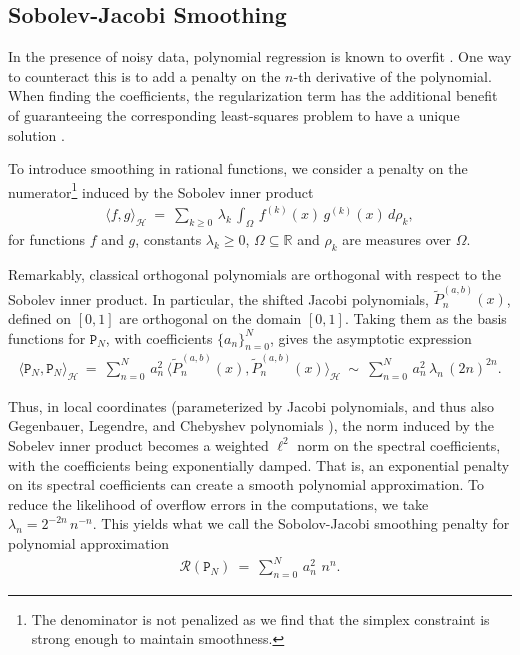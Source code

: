\documentclass{article}
\newcommand{\PP}{{\mathtt P}}
\begin{document}
\subsection{Sobolev-Jacobi Smoothing} {In the presence of noisy data, polynomial regression is known to overfit \cite{intro_to_stat_learning}. One way to counteract this is to add a penalty on the $n$-th derivative of the polynomial. When finding the coefficients, the regularization term has the additional benefit of guaranteeing the corresponding least-squares problem to have a unique solution \cite{Hoerl2000, vanwieringen2023}.} 

To introduce smoothing in rational functions, we consider a penalty on the numerator\footnote{The denominator is not penalized as we find that the simplex constraint is strong enough to maintain smoothness.} induced by the Sobolev inner product
\begin{eqnarray}
    \langle f, g\rangle_\mathcal{H}\ =\ \sum_{k\geq0}\, \lambda_k\, \int_\Omega \, f^{(k)}(x)\, g^{(k)}(x)\, d\rho_k,
\end{eqnarray}
for functions $f$ and $g$, constants $\lambda_k \geq 0$, $\Omega \subseteq \mathbb{R}$ and $\rho_k$ are measures over $\Omega$.

Remarkably, classical orthogonal polynomials are orthogonal with respect to the Sobolev inner product. In particular, the shifted Jacobi polynomials, $\widetilde{P}_n^{(a,b)}(x)$, defined on $[0,1]$ are orthogonal on the domain $[0, 1]$. Taking them as the basis functions for $\PP_N$, with coefficients $\{a_n\}_{n=0}^N$, gives the asymptotic expression
\begin{eqnarray}
    \langle \PP_N, \PP_N\rangle_{\mathcal{H}}\ =\ \sum_{n=0}^N\, a_n^2\, \langle\widetilde{P}_n^{(a,b)}(x), \widetilde{P}_n^{(a,b)}(x)\rangle_\mathcal{H}\ \sim\ \sum_{n=0}^N\, a_n^2 \, \lambda_n\, (2n)^{2n}.
\end{eqnarray}

Thus, in local coordinates (parameterized by Jacobi polynomials, and thus also Gegenbauer, Legendre, and Chebyshev polynomials \cite{orthogonal_polynomials_textbook}), the norm induced by the Sobelev inner product becomes a weighted $\ell^2$ norm on the spectral coefficients, with the coefficients being exponentially damped. That is, an exponential penalty on its spectral coefficients can create a smooth polynomial approximation. To reduce the likelihood of overflow errors in the computations, we take $\lambda_n = 2^{-2n}\, n^{-n}$. This yields what we call the Sobolov-Jacobi smoothing penalty for polynomial approximation
\begin{eqnarray}
    \mathcal{R}(\PP_N)\ =\ \sum_{n=0}^N\, a_n^2\, \, n^{n}.
\end{eqnarray}
\end{document}
